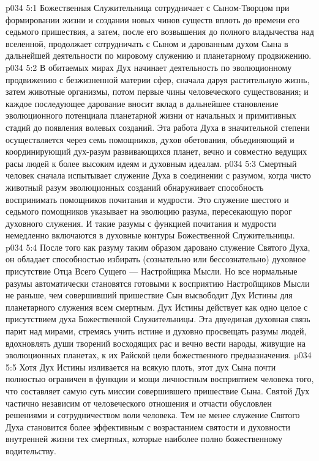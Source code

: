 \vs p034 5:1 Божественная Служительница сотрудничает с Сыном\hyp{}Творцом при формировании жизни и создании новых чинов существ вплоть до времени его седьмого пришествия, а затем, после его возвышения до полного владычества над вселенной, продолжает сотрудничать с Сыном и дарованным духом Сына в дальнейшей деятельности по мировому служению и планетарному продвижению.
\vs p034 5:2 В обитаемых мирах Дух начинает деятельность по эволюционному продвижению с безжизненной материи сфер, сначала даруя растительную жизнь, затем животные организмы, потом первые чины человеческого существования; и каждое последующее дарование вносит вклад в дальнейшее становление эволюционного потенциала планетарной жизни от начальных и примитивных стадий до появления волевых созданий. Эта работа Духа в значительной степени осуществляется через семь помощников, духов обетования, объединяющий и координирующий дух\hyp{}разум развивающихся планет, вечно и совместно ведущих расы людей к более высоким идеям и духовным идеалам.
\vs p034 5:3 \pc Смертный человек сначала испытывает служение Духа в соединении с разумом, когда чисто животный разум эволюционных созданий обнаруживает способность воспринимать помощников почитания и мудрости. Это служение шестого и седьмого помощников указывает на эволюцию разума, пересекающую порог духовного служения. И такие разумы с функцией почитания и мудрости немедленно включаются в духовные контуры Божественной Служительницы.
\vs p034 5:4 После того как разуму таким образом даровано служение Святого Духа, он обладает способностью избирать (сознательно или бессознательно) духовное присутствие Отца Всего Сущего --- Настройщика Мысли. Но все нормальные разумы автоматически становятся готовыми к восприятию Настройщиков Мысли не раньше, чем совершивший пришествие Сын высвободит Дух Истины для планетарного служения всем смертным. Дух Истины действует как одно целое с присутствием духа Божественной Служительницы. Эта двуединая духовная связь парит над мирами, стремясь учить истине и духовно просвещать разумы людей, вдохновлять души творений восходящих рас и вечно вести народы, живущие на эволюционных планетах, к их Райской цели божественного предназначения.
\vs p034 5:5 Хотя Дух Истины изливается на всякую плоть, этот дух Сына почти полностью ограничен в функции и мощи личностным восприятием человека того, что составляет самую суть миссии совершившего пришествие Сына. Святой Дух частично независим от человеческого отношения и отчасти обусловлен решениями и сотрудничеством воли человека. Тем не менее служение Святого Духа становится более эффективным с возрастанием святости и духовности внутренней жизни тех смертных, которые наиболее полно  божественному водительству.
